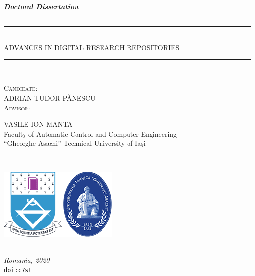 
\begin{titlepage}
  \centering
  \vspace*{\baselineskip}
  \textbf{\textit{Doctoral Dissertation}}
  \\\vspace*{\baselineskip}
  \rule{\textwidth}{1.6pt}\vspace*{-\baselineskip}\vspace*{2pt}
  \rule{\textwidth}{0.4pt}\\[\baselineskip]
  {ADVANCES IN DIGITAL RESEARCH REPOSITORIES}
  \rule{\textwidth}{0.4pt}\vspace*{-\baselineskip}\vspace*{2pt}
  \rule{\textwidth}{1.6pt}\\[\baselineskip]
  \scshape
  \vspace*{4\baselineskip}
  Candidate:
  \\\vspace*{0.5\baselineskip}
  ADRIAN-TUDOR P\u{A}NESCU
  \\\vspace*{4\baselineskip}
  Advisor:
  \\\vspace*{\baselineskip}
  \begin{minipage}{0.9\textwidth}
    \centering
    VASILE ION MANTA\\
    Faculty of Automatic Control and Computer Engineering\\``Gheorghe Asachi'' Technical University of Ia\c{s}i
  \end{minipage}
  \\\vspace*{0.5\baselineskip}
  \begin{minipage}{0.8\textwidth}
    \centering
    \includegraphics[scale=0.7]{figures/logo.png}
  \end{minipage}
  \\\vspace*{2\baselineskip}
  \textit{Romania, 2020}
  \\\vspace*{0.3\baselineskip}
  \texttt{doi:c7st}
\end{titlepage}